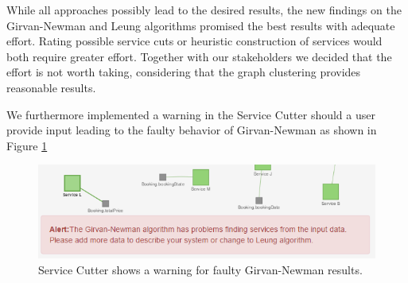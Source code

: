 While all approaches possibly lead to the desired results, the new findings on the Girvan-Newman and Leung algorithms promised the best results with adequate effort. Rating possible service cuts or heuristic construction of services would both require greater effort. Together with our stakeholders we decided that the effort is not worth taking, considering that the graph clustering provides reasonable results. 

We furthermore implemented a warning in the Service Cutter should a user provide input leading to the faulty behavior of Girvan-Newman as shown in Figure \ref{fig:girvanNewmanWarning}

\begin{figure}[H]
	\begin{center}
		\includegraphics[scale=0.9]{images/grivanNewmanAlert.png}
	\end{center}
	\caption{Service Cutter shows a warning for faulty Girvan-Newman results.}
	\label{fig:girvanNewmanWarning}
\end{figure}
	